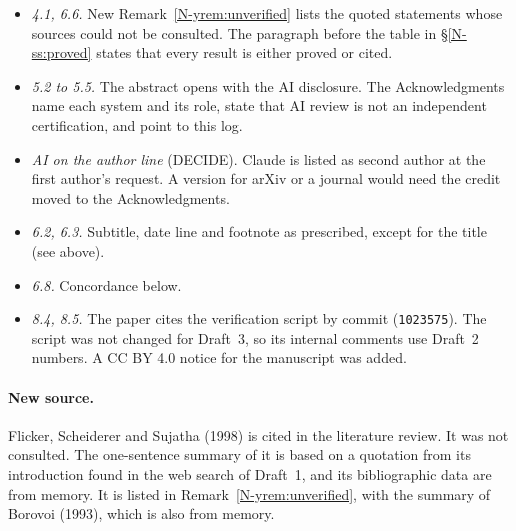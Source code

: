 \documentclass[12pt,letterpaper]{article}
\begin{document}
\begin{itemize}[itemsep=1pt]
\item \emph{4.1, 6.6.} New Remark~\ref{N-yrem:unverified} lists the
  quoted statements whose sources could not be consulted. The paragraph
  before the table in \S\ref{N-ss:proved} states that every result is
  either proved or cited.
\item \emph{5.2 to 5.5.} The abstract opens with the AI disclosure. The
  Acknowledgments name each system and its role, state that AI review is
  not an independent certification, and point to this log.
\item \emph{AI on the author line} (DECIDE). Claude is listed as second
  author at the first author's request. A version for arXiv or a journal
  would need the credit moved to the Acknowledgments.
\item \emph{6.2, 6.3.} Subtitle, date line and footnote as prescribed,
  except for the title (see above).
\item \emph{6.8.} Concordance below.
\item \emph{8.4, 8.5.} The paper cites the verification script by commit
  (\texttt{1023575}). The script was not changed for Draft~3, so its
  internal comments use Draft~2 numbers. A CC BY 4.0 notice for the
  manuscript was added.
\end{itemize}

\paragraph{New source.} Flicker, Scheiderer and Sujatha (1998) is cited
in the literature review. It was not consulted. The one-sentence summary
of it is based on a quotation from its introduction found in the web
search of Draft~1, and its bibliographic data are from memory. It is
listed in Remark~\ref{N-yrem:unverified}, with the summary of Borovoi
(1993), which is also from memory.
\end{document}
